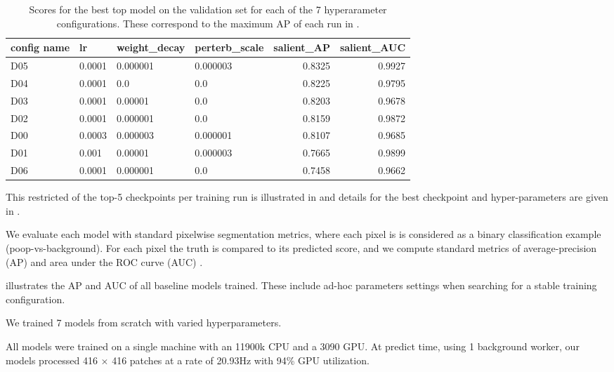 \documentclass[10pt,twocolumn,letterpaper]{article}
\begin{document}
\begin{table*}[t]
\centering
\begin{tabular}{llllrr}
\toprule
config name &      lr & weight\_decay & perterb\_scale &  salient\_AP &  salient\_AUC \\
\midrule
D05 &  0.0001 &     0.000001 &      0.000003 &    0.8325&     0.9927\\
D04 &  0.0001 &          0.0 &           0.0 &    0.8225&     0.9795\\
D03 &  0.0001 &      0.00001 &           0.0 &    0.8203&     0.9678\\
D02 &  0.0001 &     0.000001 &           0.0 &    0.8159&     0.9872\\
D00 &  0.0003 &     0.000003 &      0.000001 &    0.8107&     0.9685\\
D01 &   0.001 &      0.00001 &      0.000003 &    0.7665&     0.9899\\
D06 &  0.0001 &     0.000001 &           0.0 &    0.7458&     0.9662\\
\bottomrule
\end{tabular}
\caption{
    Scores for the best top model on the validation set for each of the 7 hyperarameter configurations. These correspond to the maximum AP 
    of each run in .
}
\label{tab:parameters_and_results}
\end{table*}


This restricted of the top-5 checkpoints per training run is illustrated in  and details for the best checkpoint and hyper-parameters are given in .

We evaluate each model with standard pixelwise segmentation metrics, where each
pixel is is considered as a binary classification example (poop-vs-background).
For each pixel the truth is compared to its predicted score, and we compute
standard metrics of average-precision (AP) and  area under the ROC curve (AUC)
\cite{powers_evaluation_2011}.

 illustrates the AP and AUC of all baseline models trained.
These include ad-hoc parameters settings when searching for a stable training
configuration.


We trained 7 models from scratch with varied hyperparameters.

All models were trained on a single machine with an 11900k CPU and a 3090 GPU.
At predict time, using 1 background worker, our models processed 416 $\times$
416 patches at a rate of 20.93Hz with 94\% GPU utilization.
\end{document}
